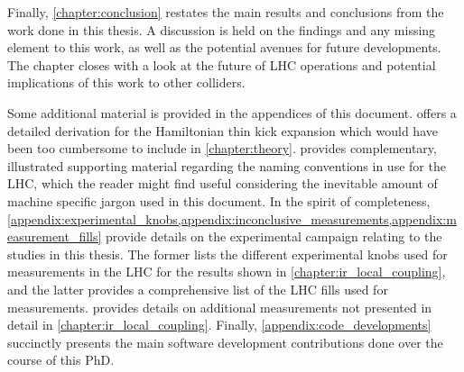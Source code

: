 Finally, \cref{chapter:conclusion} restates the main results and conclusions from the work done in this thesis.
A discussion is held on the findings and any missing element to this work, as well as the potential avenues for future developments.
The chapter closes with a look at the future of LHC operations and potential implications of this work to other colliders.

Some additional material is provided in the appendices of this document.
 offers a detailed derivation for the Hamiltonian thin kick expansion which would have been too cumbersome to include in \cref{chapter:theory}.
 provides complementary, illustrated supporting material regarding the naming conventions in use for the \gls{LHC}, which the reader might find useful considering the inevitable amount of machine specific jargon used in this document.
In the spirit of completeness, \cref{appendix:experimental_knobs,appendix:inconclusive_measurements,appendix:measurement_fills} provide details on the experimental campaign relating to the studies in this thesis.
The former lists the different experimental knobs used for measurements in the LHC for the results shown in \cref{chapter:ir_local_coupling}, and the latter provides a comprehensive list of the LHC fills used for measurements.
 provides details on additional measurements not presented in detail in \cref{chapter:ir_local_coupling}.
Finally, \cref{appendix:code_developments} succinctly presents the main software development contributions done over the course of this PhD.

\glsresetall                                     %
